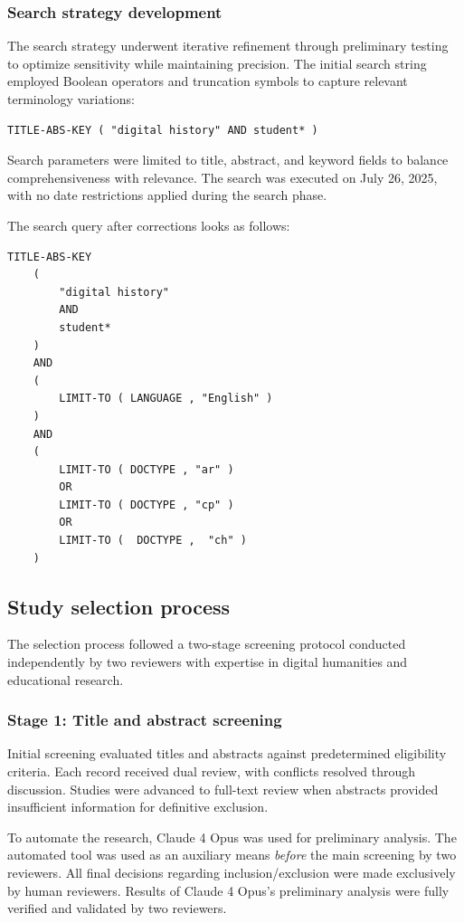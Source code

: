 \documentclass[
hf,
]{ceurart}
\begin{document}
\subsubsection{Search strategy development}

The search strategy underwent iterative refinement through preliminary testing to optimize sensitivity while maintaining precision. The initial search string employed Boolean operators and truncation symbols to capture relevant terminology variations:

\begin{verbatim}
TITLE-ABS-KEY ( "digital history" AND student* )
\end{verbatim}

Search parameters were limited to title, abstract, and keyword fields to balance comprehensiveness with relevance. The search was executed on July 26, 2025, with no date restrictions applied during the search phase.

The search query after corrections looks as follows:
\begin{verbatim}
TITLE-ABS-KEY 
    ( 
        "digital history" 
        AND 
        student* 
    ) 
    AND
    ( 
        LIMIT-TO ( LANGUAGE , "English" ) 
    ) 
    AND 
    ( 
        LIMIT-TO ( DOCTYPE , "ar" ) 
        OR 
        LIMIT-TO ( DOCTYPE , "cp" ) 
        OR 
        LIMIT-TO (  DOCTYPE ,  "ch" ) 
    )
\end{verbatim}


\subsection{Study selection process}

The selection process followed a two-stage screening protocol conducted independently by two reviewers with expertise in digital humanities and educational research.

\subsubsection{Stage 1: Title and abstract screening}

Initial screening evaluated titles and abstracts against predetermined eligibility criteria. Each record received dual review, with conflicts resolved through discussion. Studies were advanced to full-text review when abstracts provided insufficient information for definitive exclusion. 

To automate the research, Claude 4 Opus was used for preliminary analysis. The automated tool was used as an auxiliary means \textit{before} the main screening by two reviewers. All final decisions regarding inclusion/exclusion were made exclusively by human reviewers. Results of Claude 4 Opus's preliminary analysis were fully verified and validated by two reviewers.
\end{document}
